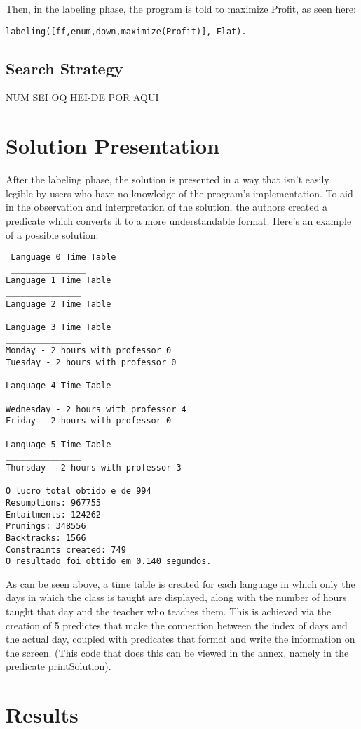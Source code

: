 \documentclass{llncs}
\begin{document}
Then, in the labeling phase, the program is told to maximize Profit, as seen here:

\begin{verbatim}
labeling([ff,enum,down,maximize(Profit)], Flat).
\end{verbatim}

\subsection{Search Strategy}
 NUM SEI OQ HEI-DE POR AQUI
 
 \section{Solution Presentation}
 After the labeling phase, the solution is presented in a way that isn't easily legible by users who have no knowledge of the program's implementation. To aid in the observation and interpretation of the solution, the authors created a predicate which converts it to a more understandable format.  Here's an example of a possible solution:
 
 \begin{verbatim}
 Language 0 Time Table
 _______________
Language 1 Time Table
_______________
Language 2 Time Table
_______________
Language 3 Time Table
_______________
Monday - 2 hours with professor 0
Tuesday - 2 hours with professor 0

Language 4 Time Table
_______________
Wednesday - 2 hours with professor 4
Friday - 2 hours with professor 0

Language 5 Time Table
_______________
Thursday - 2 hours with professor 3

O lucro total obtido e de 994
Resumptions: 967755
Entailments: 124262
Prunings: 348556
Backtracks: 1566
Constraints created: 749
O resultado foi obtido em 0.140 segundos.
 \end{verbatim}
 
 As can be seen above, a time table is created for each language in which only the days in which the class is taught are displayed, along with the number of hours taught that day and the teacher who teaches them. This is achieved via the creation of 5 predictes that make the connection between the index of days and the actual day, coupled with predicates that format and write the information on the screen. (This code that does this can be viewed in the annex, namely in the predicate printSolution).
 
 \section{Results}
 
\end{document}
